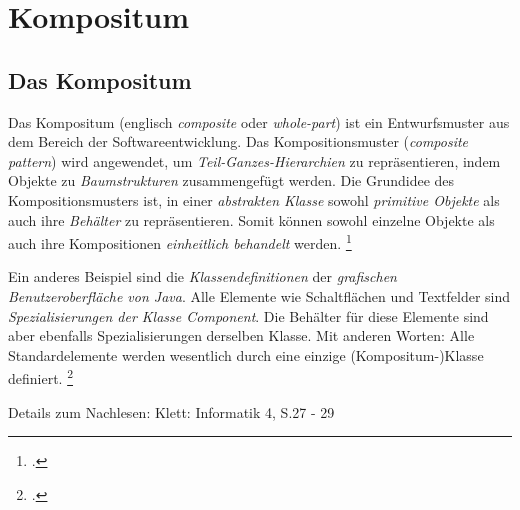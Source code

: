 \documentclass{bschlangaul-theorie}
\begin{document}

\chapter{Kompositum}

\begin{liQuellen}
\item \cite{wiki:kompositum}
\item \cite[Seite 139-147]{gof}
\item \cite[Seite 102-104]{eilebrecht}
\item \cite[Kapitel 14, Seite 173]{siebler}
\end{liQuellen}

\section{Das Kompositum}

Das Kompositum (englisch \emph{composite} oder \emph{whole-part}) ist
ein Entwurfsmuster aus dem Bereich der Softwareentwicklung. Das
Kompositionsmuster (\emph{composite pattern}) wird angewendet, um
\emph{Teil-Ganzes-Hierarchien} zu repräsentieren, indem Objekte zu
\emph{Baumstrukturen} zusammengefügt werden. Die Grundidee des
Kompositionsmusters ist, in einer \emph{abstrakten Klasse} sowohl
\emph{primitive Objekte} als auch ihre \emph{Behälter} zu
repräsentieren. Somit können sowohl einzelne Objekte als auch ihre
Kompositionen \emph{einheitlich behandelt} werden.
\footcite{aud:fs:4}

Ein anderes Beispiel sind die \emph{Klassendefinitionen} der
\emph{grafischen Benutzeroberfläche von Java}. Alle Elemente wie
Schaltflächen und Textfelder sind \emph{Spezialisierungen der Klasse
Component}. Die Behälter für diese Elemente sind aber ebenfalls
Spezialisierungen derselben Klasse. Mit anderen Worten: Alle
Standardelemente werden wesentlich durch eine einzige
(Kompositum-)Klasse definiert.
\footcite{wiki:kompositum}

\begin{center}
\bEntwurfsKompositumUml
\end{center}

Details zum Nachlesen: Klett: Informatik 4, S.27 - 29
\end{document}
